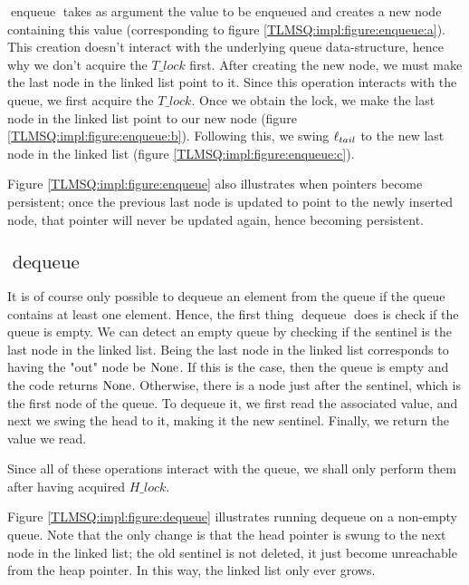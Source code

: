 \documentclass[a4paper, 11pt]{report}
\newcommand{\enqueue}{\operatorname{enqueue}}
\newcommand{\dequeue}{\operatorname{dequeue}}
\begin{document}
$\enqueue$ takes as argument the value to be enqueued and creates a new node containing this value (corresponding to figure \ref{TLMSQ:impl:figure:enqueue:a}). This creation doesn't interact with the underlying queue data-structure, hence why we don't acquire the $T\_lock$ first. After creating the new node, we must make the last node in the linked list point to it. Since this operation interacts with the queue, we first acquire the $T\_lock$. Once we obtain the lock, we make the last node in the linked list point to our new node (figure \ref{TLMSQ:impl:figure:enqueue:b}). Following this, we swing $\ell_{tail}$ to the new last node in the linked list (figure \ref{TLMSQ:impl:figure:enqueue:c}).

Figure \ref{TLMSQ:impl:figure:enqueue} also illustrates when pointers become persistent; once the previous last node is updated to point to the newly inserted node, that pointer will never be updated again, hence becoming persistent.

\subsection[dequeue]{$\dequeue$}

It is of course only possible to dequeue an element from the queue if the queue contains at least one element. Hence, the first thing $\dequeue$ does is check if the queue is empty. We can detect an empty queue by checking if the sentinel is the last node in the linked list. Being the last node in the linked list corresponds to having the "out" node be $\operatorname{None}$. If this is the case, then the queue is empty and the code returns $\operatorname{None}$. Otherwise, there is a node just after the sentinel, which is the first node of the queue. To dequeue it, we first read the associated value, and next we swing the head to it, making it the new sentinel. Finally, we return the value we read.

Since all of these operations interact with the queue, we shall only perform them after having acquired $H\_lock$.

Figure \ref{TLMSQ:impl:figure:dequeue} illustrates running dequeue on a non-empty queue. Note that the only change is that the head pointer is swung to the next node in the linked list; the old sentinel is not deleted, it just become unreachable from the heap pointer. In this way, the linked list only ever grows.
\end{document}
